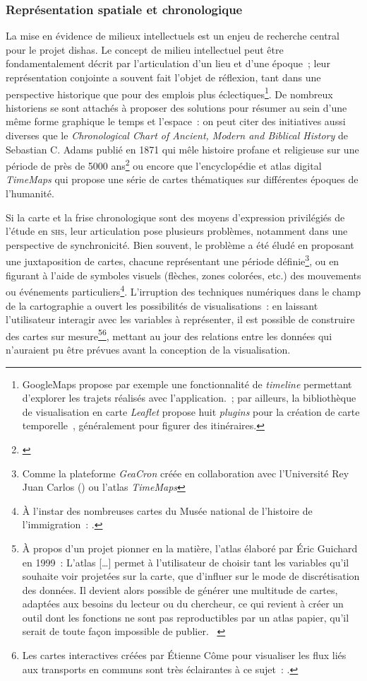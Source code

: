 \documentclass[a4paper,12pt,twoside]{book}
\newcommand{\eng}{\emph}
\newcommand{\shs}{\textsc{shs}\xspace}
\newcommand{\p}{[\ldots]\xspace}
\newcommand{\g}[1]{\og#1~\fg}
\newcommand{\dishas}{\gls{dishas}\xspace}
\begin{document}
			\subsubsection{Représentation spatiale et chronologique}
La mise en évidence de milieux intellectuels est un enjeu de recherche central pour le projet \dishas. Le concept de milieu intellectuel peut être fondamentalement décrit par l'articulation d'un lieu et d'une époque~; leur représentation conjointe a souvent fait l'objet de réflexion, tant dans une perspective historique que pour des emplois plus éclectiques\footnote{GoogleMaps propose par exemple une fonctionnalité de \eng{timeline} permettant d'explorer les trajets réalisés avec l'application.~; par ailleurs, la bibliothèque de visualisation en carte \eng{Leaflet} propose huit \eng{plugins} pour la création de \g{carte temporelle}, généralement pour figurer des itinéraires.}. De nombreux historiens se sont attachés à proposer des solutions pour résumer au sein d'une même forme graphique le temps et l'espace~: on peut citer des initiatives aussi diverses que le \eng{Chronological Chart of Ancient, Modern and Biblical History} de Sebastian C. Adams publié en 1871 qui mêle histoire profane et religieuse sur une période de près de 5000 ans\footnote{\cite{AdamsSynchronologicalChart}} ou encore que l'encyclopédie et atlas digital \eng{TimeMaps} qui propose une série de cartes thématiques sur différentes époques de l'humanité.

Si la carte et la frise chronologique sont des moyens d'expression privilégiés de l'étude en \shs, leur articulation pose plusieurs problèmes, notamment dans une perspective de synchronicité. Bien souvent, le problème a été éludé en proposant une juxtaposition de cartes, chacune représentant une période définie\footnote{Comme la plateforme \emph{GeaCron} créée en collaboration avec l'Université Rey Juan Carlos (\cite{WorldHistoryMaps}) ou l'atlas \eng{TimeMaps}}, ou en figurant à l'aide de symboles visuels (flèches, zones colorées, etc.) des mouvements ou événements particuliers\footnote{À l'instar des nombreuses cartes du Musée national de l'histoire de l'immigration~: \cite{CartesMuseeNational}.}. L'irruption des techniques numériques dans le champ de la cartographie a ouvert les possibilités de visualisations~: en laissant l'utilisateur interagir avec les variables à représenter, il est possible de construire des cartes sur mesure\footnote{À propos d'un projet pionner en la matière, l'atlas élaboré par Éric Guichard en 1999~: \g{L’atlas \p permet à l’utilisateur de choisir tant les variables qu’il souhaite voir projetées sur la carte, que d’influer sur le mode de discrétisation des données. Il devient alors possible de générer une multitude de cartes, adaptées aux besoins du lecteur ou du chercheur, ce qui revient à créer un outil dont les fonctions ne sont pas reproductibles par un atlas papier, qu’il serait de toute façon impossible de publier.} \cite{massotDessinerActeursHumanites2018}}\footnote{Les cartes interactives créées par Étienne Côme pour visualiser les flux liés aux transports en communs sont très éclairantes à ce sujet~: \cite{comePortfolioEtienneCome}.}, mettant au jour des relations entre les données qui n'auraient pu être prévues avant la conception de la visualisation.
\end{document}
